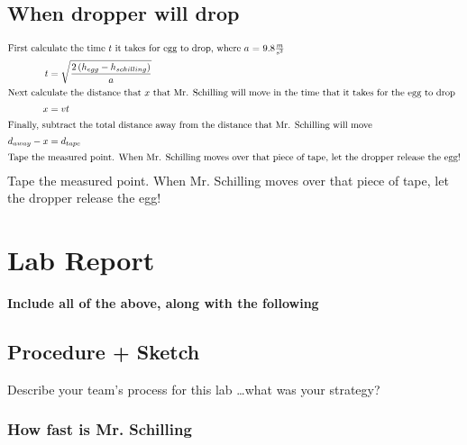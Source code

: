 \documentclass[12pt]{article}
\begin{document}
\subsection{When dropper will drop}

\begin{align*}
	\intertext{First calculate the time \(t\) it takes for egg to drop, where \(a\) = \(9.8 \frac{m}{s^2}\)}
	t          & =\sqrt{\frac{2\left(h_{egg}-h_{schilling}\right)}{a}} \\
	\intertext{Next calculate the distance that \(x\) that Mr. Schilling will move in the time that it takes for the egg to drop  }
	x          & =vt                                                   \\
	\intertext{Finally, subtract the total distance away from the distance that Mr. Schilling will move}
	d_{away}-x & =d_{tape}                                             \\
	\intertext{Tape the measured point. When Mr. Schilling moves over that piece of tape, let the dropper release the egg!}
\end{align*}
Tape the measured point. When Mr. Schilling moves over that piece of tape, let the dropper release the egg!

\section{Lab Report}

\textbf{Include all of the above, along with the following}

\subsection{Procedure + Sketch}
Describe your team's process for this lab \ldots what was your strategy?

\subsubsection{How fast is Mr. Schilling}
\end{document}
